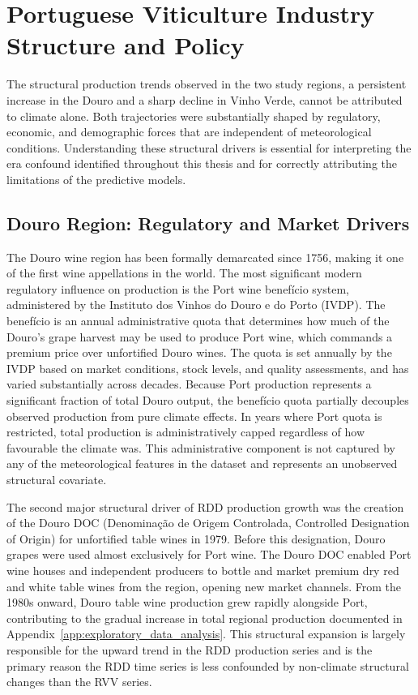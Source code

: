 \section{Portuguese Viticulture Industry Structure and Policy}\label{sec:portuguese_viticulture_industry_structure}

The structural production trends observed in the two study regions, a persistent increase in the Douro and a sharp decline in Vinho Verde, cannot be attributed to climate alone. Both trajectories were substantially shaped by regulatory, economic, and demographic forces that are independent of meteorological conditions. Understanding these structural drivers is essential for interpreting the era confound identified throughout this thesis and for correctly attributing the limitations of the predictive models.


\subsection{Douro Region: Regulatory and Market Drivers}\label{sub:douro_region_regulatory_and}

The Douro wine region has been formally demarcated since 1756, making it one of the first wine appellations in the world. The most significant modern regulatory influence on production is the Port wine benef\'icio system, administered by the Instituto dos Vinhos do Douro e do Porto (IVDP). The benef\'icio is an annual administrative quota that determines how much of the Douro's grape harvest may be used to produce Port wine, which commands a premium price over unfortified Douro wines. The quota is set annually by the IVDP based on market conditions, stock levels, and quality assessments, and has varied substantially across decades. Because Port production represents a significant fraction of total Douro output, the benef\'icio quota partially decouples observed production from pure climate effects. In years where Port quota is restricted, total production is administratively capped regardless of how favourable the climate was. This administrative component is not captured by any of the meteorological features in the dataset and represents an unobserved structural covariate.

The second major structural driver of RDD production growth was the creation of the Douro DOC (Denomina\c{c}\~ao de Origem Controlada, Controlled Designation of Origin) for unfortified table wines in 1979. Before this designation, Douro grapes were used almost exclusively for Port wine. The Douro DOC enabled Port wine houses and independent producers to bottle and market premium dry red and white table wines from the region, opening new market channels. From the 1980s onward, Douro table wine production grew rapidly alongside Port, contributing to the gradual increase in total regional production documented in Appendix~\ref{app:exploratory_data_analysis}. This structural expansion is largely responsible for the upward trend in the RDD production series and is the primary reason the RDD time series is less confounded by non-climate structural changes than the RVV series.


